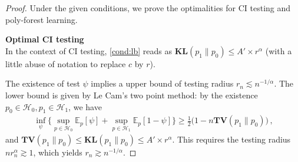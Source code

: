 \documentclass{article}
\theoremstyle{definition}
\theoremstyle{definition}
\theoremstyle{definition}
\theoremstyle{definition}
\theoremstyle{definition}
\theoremstyle{definition}
\theoremstyle{remark}
\theoremstyle{remark}
\newcommand{\E}{\mathbb{E}}
\newcommand{\hone}{\mathcal{H}_1}
\newcommand{\hzero}{\mathcal{H}_0}
\begin{document}
\begin{proof}
    Under the given conditions, we prove the optimalities for CI testing and poly-forest learning.
    
    \bigskip
    \noindent
    \textbf{Optimal CI testing} \\
    In the context of CI testing, \ref{cond:lb} reads as $\mathbf{KL}(p_1 \|p_0)\le A'\times r^{\alpha}$ (with a little abuse of notation to replace $c$ by $r$).
    
    The existence of test $\psi$ implies a upper bound of testing radius $r_n\lesssim n^{-1/\alpha}$. The lower bound is given by Le Cam's two point method: by the existence $p_0\in\hzero,p_1\in\hone$, we have
    \begin{align*}
       \inf_{\psi}\bigg\{\sup_{p\in \hzero}\E_p [\psi] + \sup_{p\in\hone}\E_p[1-\psi]\bigg\} \ge \frac{1}{2}\Big(1-n\mathbf{TV}(p_1\|p_0)\Big)\,,
    \end{align*}
    and $\mathbf{TV}(p_1\| p_0)\le \mathbf{KL}(p_1\| p_0)\le A'\times r^\alpha$. This requires the testing radius $nr_n^\alpha\gtrsim 1$, which yields $r_n\gtrsim n^{-1/\alpha}$.
    

\end{proof}
\end{document}
